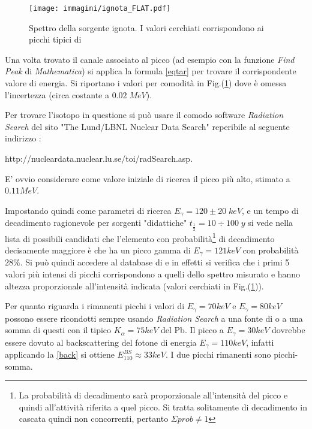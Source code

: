 \documentclass[12pt,a4paper,openright,twoside]{article}
\numberwithin{equation}{section} %
\begin{document}
\begin{figure}[hbtp]
\centering
\texttt{[image: immagini/ignota\_FLAT.pdf]}
\caption{Spettro della sorgente ignota. I valori cerchiati corrispondono ai picchi tipici di }
\label{ignota}
\end{figure}


Una volta trovato il canale associato al picco (ad esempio con la funzione \textit{Find Peak} di \textit{Mathematica}) si applica la formula \ref{eqtar} per trovare il corrispondente valore di energia. Si riportano i valori per comodità in Fig.(\ref{ignota}) dove è omessa l'incertezza (circa costante a $0.02 \; MeV$).

Per trovare l'isotopo in questione si può usare il comodo software \textit{Radiation Search} del sito "The Lund/LBNL Nuclear Data Search" reperibile al seguente indirizzo : 

http://nucleardata.nuclear.lu.se/toi/radSearch.asp. 

E' ovvio considerare come valore iniziale di ricerca il picco più alto, stimato a $0.11 MeV$.

Impostando quindi come parametri di ricerca $E_{\gamma}= 120 \pm 20 \; keV$, e un tempo di decadimento ragionevole per sorgenti "didattiche" $t_{\frac{1}{2}}=10 \div 100 \; y$ si vede nella lista di possibili candidati che l'elemento con probabilità\footnote{La probabilità di decadimento sarà proporzionale all'intensità del picco e quindi all'attività riferita a quel picco. Si tratta solitamente di decadimento in cascata quindi non concorrenti, pertanto $\Sigma prob \neq 1$ } di decadimento decisamente maggiore è \textbf{} che ha un picco gamma di $E_{\gamma}=121 keV$ con probabilità $28 \%$.
Si può quindi accedere al database di  e in effetti si verifica che i primi 5 valori più intensi di picchi corrispondono a quelli dello spettro misurato e hanno altezza proporzionale all'intensità indicata (valori cerchiati in Fig.(\ref{ignota})).

Per quanto riguarda i rimanenti picchi i valori di $E_{\gamma}=70 keV$ e $E_{\gamma}=80 keV$ possono essere ricondotti sempre usando \textit{Radiation Search} a una fonte di  o a una somma di questi con il tipico $K_{\alpha}=75keV$ del Pb.
Il picco a $E_{\gamma}=30 keV$ dovrebbe essere dovuto al backscattering del fotone di energia $E_{\gamma}=110 keV$, infatti applicando la \ref{back} si ottiene $E_{110} ^{BS} \approx 33 keV$.
I due picchi rimanenti sono picchi-somma.
\end{document}
